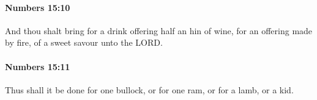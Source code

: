 		\paragraph{Numbers 15:10} %
			\label{NUMBERS-15-10}

			And thou shalt bring for a drink offering half an hin of wine, for an offering made by fire, of a sweet savour unto the LORD.


		\paragraph{Numbers 15:11} %
			\label{NUMBERS-15-11}

			Thus shall it be done for one bullock, or for one ram, or for a lamb, or a kid.


